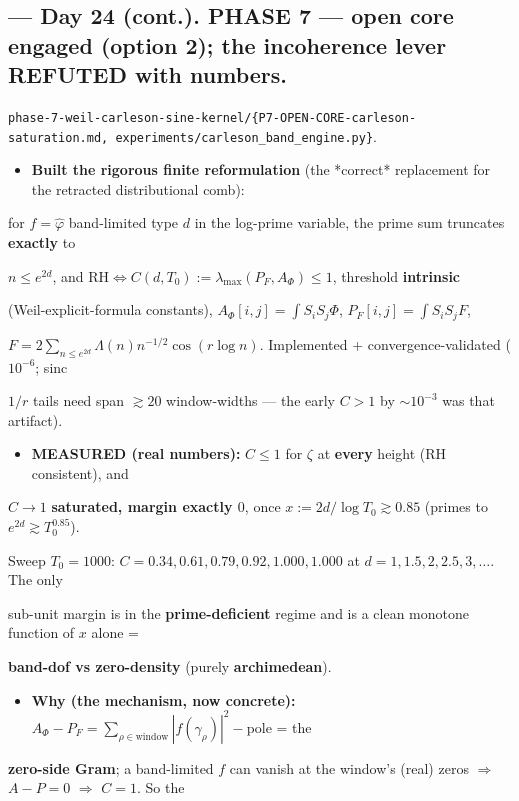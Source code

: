 \documentclass[10pt]{article}
\begin{document}
\subsection*{ --- Day 24 (cont.). PHASE 7 --- open core engaged (option 2); the incoherence lever REFUTED with numbers.}
\texttt{phase-7-weil-carleson-sine-kernel/\{P7-OPEN-CORE-carleson-saturation.md, experiments/carleson\_band\_engine.py\}}.\par
\begin{itemize}
\item \textbf{Built the rigorous finite reformulation} (the *correct* replacement for the retracted distributional comb):
\end{itemize}
  for $f=\hat\varphi$ band-limited type $d$ in the log-prime variable, the prime sum truncates \textbf{exactly} to\par
  $n\le e^{2d}$, and $\mathrm{RH}\iff C(d,T_0):=\lambda_{\max}(P_F,A_\Phi)\le1$, threshold \textbf{intrinsic}\par
  (Weil-explicit-formula constants), $A_\Phi[i,j]=\int S_iS_j\Phi$, $P_F[i,j]=\int S_iS_jF$,\par
  $F=2\sum_{n\le e^{2d}}\Lambda(n)n^{-1/2}\cos(r\log n)$. Implemented + convergence-validated ($10^{-6}$; sinc\par
  $1/r$ tails need span $\gtrsim20$ window-widths --- the early $C{>}1$ by $\sim10^{-3}$ was that artifact).\par
\begin{itemize}
\item \textbf{MEASURED (real numbers):} $C\le1$ for $\zeta$ at \textbf{every} height (RH consistent), and
\end{itemize}
  $C\to1$ \textbf{saturated, margin exactly $0$}, once $x:=2d/\log T_0\gtrsim0.85$ (primes to $e^{2d}\gtrsim T_0^{0.85}$).\par
  Sweep $T_0{=}1000$: $C=0.34,0.61,0.79,0.92,\mathbf{1.000},\mathbf{1.000}$ at $d=1,1.5,2,2.5,3,\dots$. The only\par
  sub-unit margin is in the \textbf{prime-deficient} regime and is a clean monotone function of $x$ alone =\par
  \textbf{band-dof vs zero-density} (purely \textbf{archimedean}).\par
\begin{itemize}
\item \textbf{Why (the mechanism, now concrete):} $A_\Phi-P_F=\sum_{\rho\in\text{window}}|f(\gamma_\rho)|^2-$pole = the
\end{itemize}
  \textbf{zero-side Gram}; a band-limited $f$ can vanish at the window's (real) zeros \ensuremath{\Rightarrow} $A-P=0$ \ensuremath{\Rightarrow} $C=1$. So the\par
\end{document}
